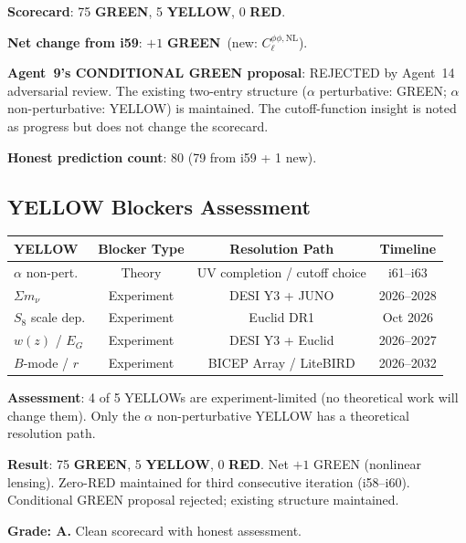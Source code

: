 \documentclass[11pt,a4paper]{article}
\newcommand{\GREEN}{\textcolor{dfdgreen}{\textbf{GREEN}}}
\newcommand{\YELLOW}{\textcolor{dfdyellow}{\textbf{YELLOW}}}
\newcommand{\RED}{\textcolor{dfdred}{\textbf{RED}}}
\begin{document}
\textbf{Scorecard}: 75 \GREEN, 5 \YELLOW, 0 \RED.

\textbf{Net change from i59}: $+1$ \GREEN\ (new: $C_\ell^{\phi\phi,\mathrm{NL}}$).

\textbf{Agent~9's CONDITIONAL GREEN proposal}: REJECTED by Agent~14 adversarial review. The existing two-entry structure ($\alpha$ perturbative: GREEN; $\alpha$ non-perturbative: YELLOW) is maintained. The cutoff-function insight is noted as progress but does not change the scorecard.

\textbf{Honest prediction count}: 80 (79 from i59 + 1 new).

\subsection{YELLOW Blockers Assessment}

\begin{center}
\begin{tabular}{lccc}
\toprule
\textbf{YELLOW} & \textbf{Blocker Type} & \textbf{Resolution Path} & \textbf{Timeline} \\
\midrule
$\alpha$ non-pert. & Theory & UV completion / cutoff choice & i61--i63 \\
$\Sigma m_\nu$ & Experiment & DESI Y3 + JUNO & 2026--2028 \\
$S_8$ scale dep. & Experiment & Euclid DR1 & Oct 2026 \\
$w(z)$ / $E_G$ & Experiment & DESI Y3 + Euclid & 2026--2027 \\
$B$-mode / $r$ & Experiment & BICEP Array / LiteBIRD & 2026--2032 \\
\bottomrule
\end{tabular}
\end{center}

\textbf{Assessment}: 4 of 5 YELLOWs are experiment-limited (no theoretical work will change them). Only the $\alpha$ non-perturbative YELLOW has a theoretical resolution path.

\begin{tcolorbox}[colback=green!5!white, colframe=green!60!black, title={Agent 19: Scorecard --- 75/5/0, Zero RED Maintained}]
\textbf{Result}: 75 \GREEN, 5 \YELLOW, 0 \RED. Net $+1$ GREEN (nonlinear lensing). Zero-RED maintained for third consecutive iteration (i58--i60). Conditional GREEN proposal rejected; existing structure maintained.

\textbf{Grade: A.} Clean scorecard with honest assessment.
\end{tcolorbox}
\end{document}
